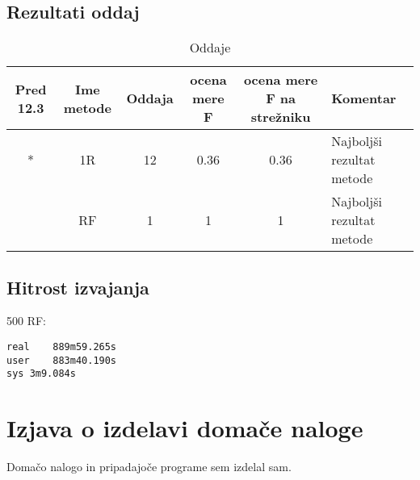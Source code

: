 \documentclass[a4paper,11pt]{article}
\begin{document}
\subsection{Rezultati oddaj}
\begin{table}[H]
\caption{Oddaje}
\begin{tabular}{ c c c c c l }
 Pred 12.3 & Ime metode & Oddaja & ocena mere F & ocena mere F na strežniku & Komentar\\
  \hline
  * & 1R & 12 & 0.36 & 0.36 & Najboljši rezultat metode \\
  \* & RF & 1 & 1 & 1 & Najboljši rezultat metode \\
 \end{tabular}
\end{table}

\subsection{Hitrost izvajanja}
500 RF:
\begin{verbatim}
real	889m59.265s
user	883m40.190s
sys	3m9.084s
\end{verbatim}

\section{Izjava o izdelavi domače naloge}
Domačo nalogo in pripadajoče programe sem izdelal sam.
\end{document}
